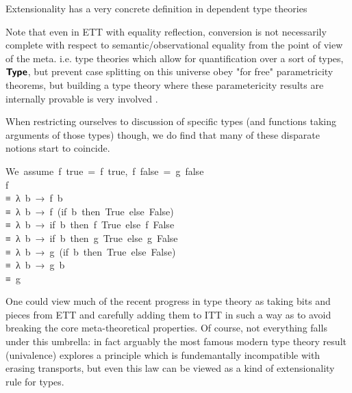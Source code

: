 \documentclass[
    a4paper, %
    fontsize=11pt, %
    twoside=false, %
	numbers=noenddot, %
	fontmethod=tex, %
]{kaobook}
\def\resethooks{%
  \global\let\SaveRestoreHook\empty
  \global\let\ColumnHook\empty}
\newlength{\blanklineskip}
\let\hspre\empty
\let\hspost\empty
\newcommand\Keyword[1]{\textsf{\textbf{#1}}}
\begin{document}
Extensionality has a very concrete definition in dependent type theories


Note that even in ETT with equality reflection, conversion is not necessarily
complete with respect to semantic/observational equality from the point of view
of the meta. i.e. type theories which allow for
quantification over a sort of types, \ensuremath{\Keyword{Type}}, but prevent case splitting
on this universe obey "for free" parametricity theorems, but building a type
theory where these parametericity results are internally provable is very 
involved .

When restricting ourselves to discussion of specific types (and functions taking
arguments of those types) though, we do find that many of these disparate
notions start to coincide.

\begin{hscode}\SaveRestoreHook
\column{B}{@{}>{\hspre}l<{\hspost}@{}}%
\column{E}{@{}>{\hspre}l<{\hspost}@{}}%
\>[B]{}\mbox{\onelinecomment  We assume f true = f true, f false = g false}{}\<[E]%
\\[\blanklineskip]%
\>[B]{}\mbox{\onelinecomment  f}{}\<[E]%
\\
\>[B]{}\mbox{\onelinecomment  ≡ λ b → f b}{}\<[E]%
\\
\>[B]{}\mbox{\onelinecomment  ≡ λ b → f (if b then True else False)}{}\<[E]%
\\
\>[B]{}\mbox{\onelinecomment  ≡ λ b → if b then f True else f False}{}\<[E]%
\\
\>[B]{}\mbox{\onelinecomment  ≡ λ b → if b then g True else g False}{}\<[E]%
\\
\>[B]{}\mbox{\onelinecomment  ≡ λ b → g (if b then True else False)}{}\<[E]%
\\
\>[B]{}\mbox{\onelinecomment  ≡ λ b → g b}{}\<[E]%
\\
\>[B]{}\mbox{\onelinecomment  ≡ g}{}\<[E]%
\ColumnHook
\end{hscode}\resethooks



One could view much of the recent progress in type theory as taking bits and
pieces from ETT and carefully adding them to ITT in such a way as to avoid
breaking the core meta-theoretical properties. Of course, not everything
falls under this umbrella: in fact arguably the most famous modern type theory
result (univalence) explores a principle which is fundemantally incompatible
with erasing transports, but even this law can  be viewed as a kind of 
extensionality rule for types.
\end{document}
